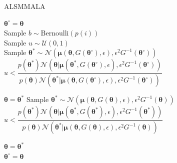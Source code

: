 \documentclass[twoside,11pt]{article}
\begin{document}
\begin{algorithm}[t]
	\caption{ALSMMALA}
	\label{alsmmala}
	\begin{algorithmic}
		\State $\boldsymbol{\theta}^{\circ}=\boldsymbol{\theta}$\\
		
		\State Sample $b \sim \mbox{Bernoulli}(p(i))$\\
		
		\State Sample $u\sim\mathcal{U}(0, 1)$\\
		
		 
		\State Sample 
		$\boldsymbol{\theta^{*}}
		\sim\mathcal{N}(\boldsymbol{\mu}(\boldsymbol{\theta}, G(\boldsymbol{\theta}^{\circ}), \epsilon),
		\epsilon^2 G^{-1}(\boldsymbol{\theta}^{\circ}))
		$\\
		
		\If
		{
			$u<\dfrac{
				p(\boldsymbol{\theta}^{*})
				\mathcal{N}(\boldsymbol{\theta}|
					\boldsymbol{\mu}(\boldsymbol{\theta}^{*},
					G(\boldsymbol{\theta}^{\circ}),
					\epsilon),
					\epsilon^2 G^{-1}(\boldsymbol{\theta}^{\circ}))
			}
			{
				p(\boldsymbol{\theta})
				\mathcal{N}(\boldsymbol{\theta}^{*}|
					\boldsymbol{\mu}(\boldsymbol{\theta},
					G(\boldsymbol{\theta}^{\circ}),
					\epsilon),
					\epsilon^2 G^{-1}(\boldsymbol{\theta}^{\circ}))
			}$
		}
		
		\State $\boldsymbol{\theta}=\boldsymbol{\theta}^{*}$
		\EndIf
		 
		\State Sample 
		$\boldsymbol{\theta^{*}}
		\sim\mathcal{N}(\boldsymbol{\mu}(\boldsymbol{\theta}, G(\boldsymbol{\theta}), \epsilon),
		\epsilon^2 G^{-1}(\boldsymbol{\theta}))
		$\\
		
		\If
		{
			$u<\dfrac{
				p(\boldsymbol{\theta}^{*})
				\mathcal{N}(\boldsymbol{\theta}|
					\boldsymbol{\mu}(\boldsymbol{\theta}^{*},
					G(\boldsymbol{\theta}^{*}),
					\epsilon),
					\epsilon^2 G^{-1}(\boldsymbol{\theta}^{*}))
			}
			{
				p(\boldsymbol{\theta})
				\mathcal{N}(\boldsymbol{\theta}^{*}|
					\boldsymbol{\mu}(\boldsymbol{\theta},
					G(\boldsymbol{\theta}),
					\epsilon),
					\epsilon^2 G^{-1}(\boldsymbol{\theta}))
			}$
		}
		
		\State $\boldsymbol{\theta}=\boldsymbol{\theta}^{*}$
		\EndIf\\
		
		\State $\boldsymbol{\theta^{\circ}}=\boldsymbol{\theta}$
		\EndIf
		
		\EndFor
	\end{algorithmic}
\end{algorithm}
\end{document}
